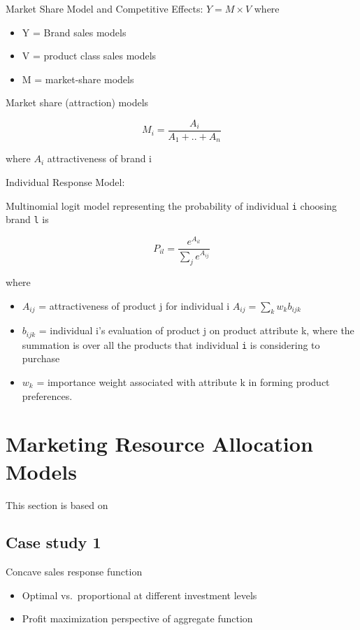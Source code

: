 \documentclass[
]{book}
\providecommand{\tightlist}{%
  \setlength{\itemsep}{0pt}\setlength{\parskip}{0pt}}
\begin{document}
Market Share Model and Competitive Effects: \(Y = M \times V\) where

\begin{itemize}
\item
  Y = Brand sales models
\item
  V = product class sales models
\item
  M = market-share models
\end{itemize}

Market share (attraction) models

\[
M_i = \frac{A_i}{A_1 + ..+ A_n}
\]

where \(A_i\) attractiveness of brand i

Individual Response Model:

Multinomial logit model representing the probability of individual \texttt{i} choosing brand \texttt{l} is

\[
P_{il} = \frac{e^{A_{il}}}{\sum_j e^{A_{ij}}}
\]

where

\begin{itemize}
\tightlist
\item
  \(A_{ij}\) = attractiveness of product j for individual i \(A_{ij} = \sum_k w_k b_{ijk}\)
\item
  \(b_{ijk}\) = individual i's evaluation of product j on product attribute k, where the summation is over all the products that individual \texttt{i} is considering to purchase
\item
  \(w_k\) = importance weight associated with attribute k in forming product preferences.
\end{itemize}

\hypertarget{marketing-resource-allocation-models}{%
\section{Marketing Resource Allocation Models}\label{marketing-resource-allocation-models}}

This section is based on \citep{Mantrala_1992}

\hypertarget{case-study-1}{%
\subsection{Case study 1}\label{case-study-1}}

Concave sales response function

\begin{itemize}
\tightlist
\item
  Optimal vs.~proportional at different investment levels
\item
  Profit maximization perspective of aggregate function
\end{itemize}
\end{document}
